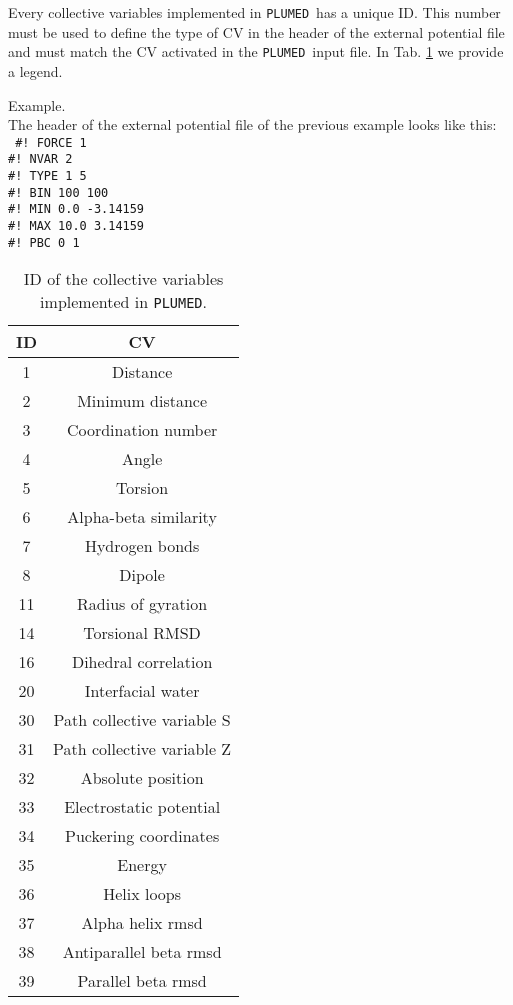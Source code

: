 \documentclass[12pt,fleqn]{report}
\newcommand{\plumed}{{\tt PLUMED}}
\newcommand{\esempio}[1]{
\vspace{10pt}
\begin{flushright}
\colorbox{light-gray}{
   \begin{minipage}{13cm}
       \scriptsize{
{\fontfamily{phv} \fontseries{b}
 \selectfont Example. \\
 \fontseries{m} \selectfont #1 } }
\end{minipage}}
\end{flushright}
\vspace{20pt}
}
\begin{document}
Every collective variables implemented in \plumed \ has a unique ID. 
This number must be used to define the type of CV in the header of the external
potential file and must match the CV activated in the \plumed \ input file. 
In Tab. \ref{id_cv} we provide a legend. 

\esempio{
The header of the external potential file of the previous example
looks like this: \vspace{10pt} \\
{\tt
\#! FORCE 1 \\
\#! NVAR  2 \\
\#! TYPE   1    5 \\
\#! BIN  100  100 \\
\#! MIN  0.0  -3.14159 \\
\#! MAX 10.0   3.14159 \\
\#! PBC    0    1 
}
}

\begin{table}
\begin{center}
\begin{tabular}{ c | c }
  {\bf ID}    & {\bf CV}  \\
\hline
1   & Distance\\
2   & Minimum distance\\
3   & Coordination number\\
4   & Angle\\
5   & Torsion\\
6   & Alpha-beta similarity\\
7   & Hydrogen bonds\\
8   & Dipole\\ 
11  & Radius of gyration\\
14  & Torsional RMSD\\
16  & Dihedral correlation\\
20  & Interfacial water\\
30  & Path collective variable S\\
31  & Path collective variable Z\\
32  & Absolute position\\
33  & Electrostatic potential\\
34  & Puckering coordinates\\
35  & Energy\\
36  & Helix loops \\
37  & Alpha helix rmsd \\
38  & Antiparallel beta rmsd \\
39  & Parallel beta rmsd \\
\hline
\end{tabular}
\caption{ID of the collective variables implemented in \plumed.}\label{id_cv}
\end{center}
\end{table}
\end{document}

